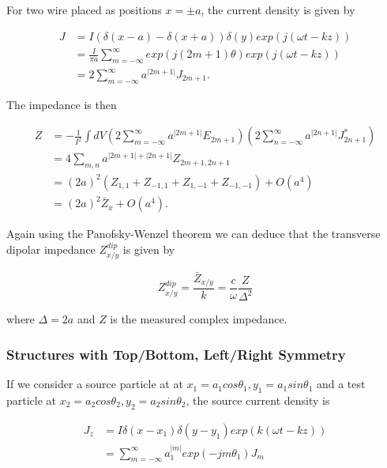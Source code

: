 For two wire placed as positions $x = \pm a$, the current density is given by \cite{Tsutsui:OnSingleWire}

\begin{align}
J & =  I \left( \delta \left( x - a \right) - \delta \left( x + a  \right) \right) \delta (y) exp \left( j \left( \omega t - kz \right) \right) \nonumber \\
& =  \frac{I}{\pi a} \displaystyle\sum\limits_{m=-\infty}^{\infty} exp \left(j \left( 2m +1 \right) \theta \right) exp \left( j \left( \omega t - kz \right) \right) \nonumber \\
& =  2\displaystyle\sum\limits_{m=-\infty}^{\infty} a^{|2m + 1 |} J_{2m + 1}.
\end{align}

The impedance is then

\begin{align}
Z & =  - \frac{1}{I^{2}} \int dV \left( 2\displaystyle\sum\limits_{m=-\infty}^{\infty} a^{|2m + 1 |} E_{2m + 1}  \right)  \left( 2\displaystyle\sum\limits_{n=-\infty}^{\infty} a^{|2n + 1 |} J_{2n + 1}^{*}  \right) \nonumber \\
& =  4 \displaystyle\sum\limits_{m,n} a^{|2m + 1 | + |2n + 1|} Z_{2m + 1, 2n+1} \nonumber \\
& =  \left(2a \right)^{2}\left( Z_{1,1} + Z_{-1,1} + Z_{1,-1} + Z_{-1,-1} \right) + O(a^{4}) \nonumber \\
& =  (2a)^{2}\bar{Z}_{x} + O(a^{4}). 
\end{align}

Again using the Panofsky-Wenzel theorem we can deduce that the transverse dipolar impedance $Z^{dip}_{x/y}$ is given by 

\begin{equation}
Z^{dip}_{x/y} = \frac{\bar{Z}_{x/y}}{k} = \frac{c}{\omega} \frac{Z}{\Delta^{2}}
\end{equation}

where $\Delta = 2a$ and $Z$ is the measured complex impedance.

\subsubsection{Structures with Top/Bottom, Left/Right Symmetry}

If we consider a source particle at at $x_{1} = a_{1}cos\theta_{1}, y_{1} = a_{1}sin\theta_{1}$ and a test particle at $x_{2} = a_{2}cos\theta_{2}, y_{2} = a_{2}sin\theta_{2}$, the source current density is

\begin{align}
J_{z} &= I\delta \left( x-x_{1} \right) \delta \left( y-y_{1} \right) exp \left( k \left( \omega t - kz \right) \right) \nonumber \\
          &=\displaystyle\sum\limits_{m=-\infty}^{\infty}a_{1}^{|m|}exp\left( -jm\theta_{1} \right) J_{m}
\end{align}

